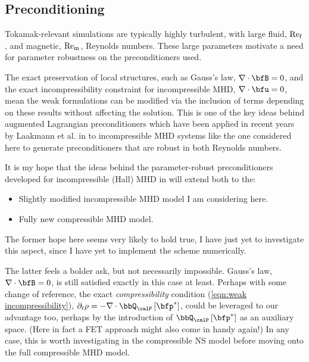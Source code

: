 \subsection*{Preconditioning}
    Tokamak-relevant simulations are typically highly turbulent, with large fluid, $\mathrm{Re}_{\mathrm{f}}$, and magnetic, $\mathrm{Re}_{\mathrm{m}}$, Reynolds numbers. These large parameters motivate a need for parameter robustness on the preconditioners used.

    The exact preservation of local structures, such as Gauss's law, $\nabla\cdot\bfB = 0$, and the exact incompressibility constraint for incompressible MHD, $\nabla\cdot\bfu = 0$, mean the weak formulations can be modified via the inclusion of terms depending on these results without affecting the solution. This is one of the key ideas behind augmented Lagrangian preconditioners \cite{FMW19} which have been applied in recent years by Laakmann et al. in \cite{Laakmann_Farrell_Mitchell_22, Laakmann_Hu_Farrell_2022} to incompressible MHD systems like the one considered here to generate preconditioners that are robust in both Reynolds numbers.

    \begin{remark}
        It is my hope that the ideas behind the parameter-robust preconditioners developed for incompressible (Hall) MHD in \cite{Laakmann_Farrell_Mitchell_22, Laakmann_Hu_Farrell_2022} will extend both to the:
        \begin{itemize}
            \item  Slightly modified incompressible MHD model I am considering here.
            \item  Fully new compressible MHD model.
        \end{itemize}
        
        The former hope here seems very likely to hold true, I have just yet to investigate this aspect, since I have yet to implement the scheme numerically.
        
        The latter feels a bolder ask, but not necessarily impossible. Gauss's law, $\nabla\cdot\bfB = 0$, is still satisfied exactly in this case at least. Perhaps with some change of reference, the exact \emph{compressibility} condition (\ref{eqn:weak incompressibility}), $\partial_{t}\rho  =  - \nabla\cdot\bbQ_{\calP}\left[\bfp^{*}\right]$, could be leveraged to our advantage too, perhaps by the introduction of $\bbQ_{\calP}\left[\bfp^{*}\right]$ as an auxiliary space. (Here in fact a FET approach might also come in handy again!) In any case, this is worth investigating in the compressible NS model before moving onto the full compressible MHD model.
    \end{remark}
    